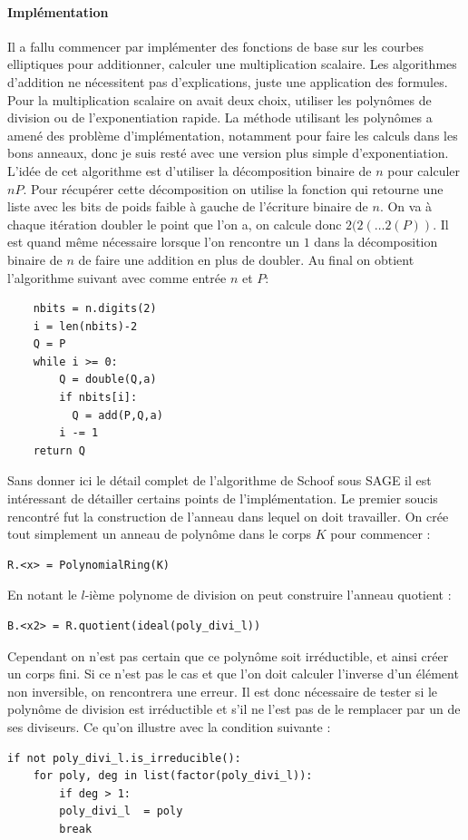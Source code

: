\documentclass[12pt]{article}
\begin{document}
\paragraph*{Implémentation}
Il a fallu commencer par implémenter des fonctions de base sur les courbes elliptiques pour additionner, calculer une multiplication scalaire. Les algorithmes d'addition ne nécessitent pas d'explications, juste une application des formules. Pour la multiplication scalaire on avait deux choix, utiliser les polynômes de division ou de l'exponentiation rapide. La méthode utilisant les polynômes a amené des problème d'implémentation, notamment pour faire les calculs dans les bons anneaux, donc je suis resté avec une version plus simple d'exponentiation. L'idée de cet algorithme est d'utiliser la décomposition binaire de $n$ pour calculer $nP$. Pour récupérer cette décomposition on utilise la fonction  qui retourne une liste avec les bits de poids faible à gauche de l'écriture binaire de $n$. On va à chaque itération doubler le point que l'on a, on calcule donc $2(2(\ldots2(P))$. Il est quand même nécessaire lorsque l'on rencontre un $1$ dans la décomposition binaire de $n$ de faire une addition en plus de doubler. Au final on obtient l'algorithme suivant avec comme entrée $n$ et $P$: 
\bigskip
\begin{lstlisting}
    nbits = n.digits(2)
    i = len(nbits)-2
    Q = P
    while i >= 0:
        Q = double(Q,a)
        if nbits[i]:
          Q = add(P,Q,a)
        i -= 1
    return Q
\end{lstlisting}
\bigskip

Sans donner ici le détail complet de l'algorithme de Schoof sous SAGE il est intéressant de détailler certains points de l'implémentation. Le premier soucis rencontré fut la construction de l'anneau dans lequel on doit travailler. On crée tout simplement un anneau de polynôme dans le corps $K$ pour commencer :
\bigskip
\begin{lstlisting}
R.<x> = PolynomialRing(K)
\end{lstlisting}
\bigskip
En notant  le $l$-ième polynome de division on peut construire l'anneau quotient : 
\bigskip

\begin{lstlisting}
B.<x2> = R.quotient(ideal(poly_divi_l))
\end{lstlisting}
\bigskip
Cependant on n'est pas certain que ce polynôme soit irréductible, et ainsi créer un corps fini. Si ce n'est pas le cas et que l'on doit calculer l'inverse d'un élément non inversible, on rencontrera une erreur. Il est donc nécessaire de tester si le polynôme de division est irréductible et s'il ne l'est pas de le remplacer par un de ses diviseurs. Ce qu'on illustre avec la condition suivante :
\bigskip
\begin{lstlisting}
if not poly_divi_l.is_irreducible():      
	for poly, deg in list(factor(poly_divi_l)):
		if deg > 1:
		poly_divi_l  = poly
		break
\end{lstlisting}
\bigskip
\end{document}
